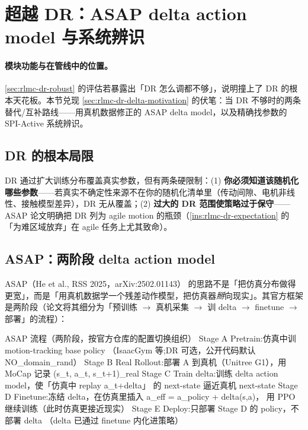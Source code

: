 \section{超越 DR：ASAP delta action model 与系统辨识}
\label{sec:rlmc-dr-beyond}

\paragraph{模块功能与在管线中的位置。}\cref{sec:rlmc-dr-robust} 的评估若暴露出「DR 怎么调都不够」，说明撞上了 DR 的根本天花板。本节兑现 \cref{sec:rlmc-dr-delta-motivation} 的伏笔：当 DR 不够时的两条替代/互补路线——用真机数据修正的 ASAP delta model，以及精确找参数的 SPI-Active 系统辨识。

\subsection{DR 的根本局限}
\label{sec:rlmc-dr-beyond-limit}

DR 通过扩大训练分布覆盖真实参数，但有两条硬限制：(1) \textbf{你必须知道该随机化哪些参数}——若真实不确定性来源不在你的随机化清单里（传动间隙、电机非线性、接触模型差异），DR 无从覆盖；(2) \textbf{过大的 DR 范围使策略过于保守}——ASAP 论文明确把 DR 列为 agile motion 的瓶颈（\cref{ins:rlmc-dr-expectation} 的「为难区域放弃」在 agile 任务上尤其致命）。

\subsection{ASAP：两阶段 delta action model}
\label{sec:rlmc-dr-beyond-asap}

ASAP（He et al., RSS 2025，arXiv:2502.01143）\cite{asap2025} 的思路不是「把仿真分布做得更宽」，而是「用真机数据学一个残差动作模型，把仿真器\emph{掰}向现实」。其官方框架是两阶段（论文将其细分为「预训练 $\to$ 真机采集 $\to$ 训 delta $\to$ finetune $\to$ 部署」的流程）：

\begin{codebox}{ASAP 流程（两阶段，按官方仓库的配置切换组织）}
Stage A  Pretrain:仿真中训 motion-tracking base policy
         （IsaacGym 等;DR 可选，公开代码默认 NO_domain_rand）
Stage B  Real Rollout:部署 A 到真机（Unitree G1），用 MoCap 记录
         (s_t, a_t, s_{t+1})_real
Stage C  Train delta:训练 delta action model，使「仿真中 replay a_t+delta」
         的 next-state 逼近真机 next-state
Stage D  Finetune:冻结 delta，在仿真里插入 a_eff = a_policy + delta(s,a)，
         用 PPO 继续训练（此时仿真更接近现实）
Stage E  Deploy:只部署 Stage D 的 policy，不部署 delta
         （delta 已通过 finetune 内化进策略）
\end{codebox}

